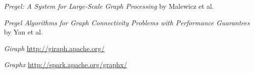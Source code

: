 \begin{RMFrame}

\BI
\item \emph{Pregel: A System for Large-Scale Graph Processing} by Malewicz et al.

\item \emph{Pregel Algorithms for Graph Connectivity Problems with
Performance Guarantees} by Yan et al.
	
\item \emph{Giraph} \url{http://giraph.apache.org/}
	
\item \emph{Graphx} \url{http://spark.apache.org/graphx/}

\EI
\end{RMFrame}


